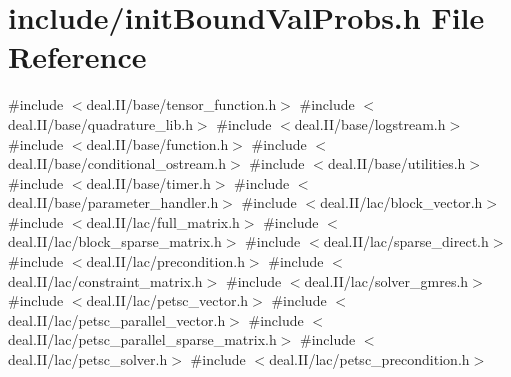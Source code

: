 \section{include/init\+Bound\+Val\+Probs.h File Reference}
\label{init_bound_val_probs_8h}
{\ttfamily \#include $<$deal.\+I\+I/base/tensor\+\_\+function.\+h$>$}\newline
{\ttfamily \#include $<$deal.\+I\+I/base/quadrature\+\_\+lib.\+h$>$}\newline
{\ttfamily \#include $<$deal.\+I\+I/base/logstream.\+h$>$}\newline
{\ttfamily \#include $<$deal.\+I\+I/base/function.\+h$>$}\newline
{\ttfamily \#include $<$deal.\+I\+I/base/conditional\+\_\+ostream.\+h$>$}\newline
{\ttfamily \#include $<$deal.\+I\+I/base/utilities.\+h$>$}\newline
{\ttfamily \#include $<$deal.\+I\+I/base/timer.\+h$>$}\newline
{\ttfamily \#include $<$deal.\+I\+I/base/parameter\+\_\+handler.\+h$>$}\newline
{\ttfamily \#include $<$deal.\+I\+I/lac/block\+\_\+vector.\+h$>$}\newline
{\ttfamily \#include $<$deal.\+I\+I/lac/full\+\_\+matrix.\+h$>$}\newline
{\ttfamily \#include $<$deal.\+I\+I/lac/block\+\_\+sparse\+\_\+matrix.\+h$>$}\newline
{\ttfamily \#include $<$deal.\+I\+I/lac/sparse\+\_\+direct.\+h$>$}\newline
{\ttfamily \#include $<$deal.\+I\+I/lac/precondition.\+h$>$}\newline
{\ttfamily \#include $<$deal.\+I\+I/lac/constraint\+\_\+matrix.\+h$>$}\newline
{\ttfamily \#include $<$deal.\+I\+I/lac/solver\+\_\+gmres.\+h$>$}\newline
{\ttfamily \#include $<$deal.\+I\+I/lac/petsc\+\_\+vector.\+h$>$}\newline
{\ttfamily \#include $<$deal.\+I\+I/lac/petsc\+\_\+parallel\+\_\+vector.\+h$>$}\newline
{\ttfamily \#include $<$deal.\+I\+I/lac/petsc\+\_\+parallel\+\_\+sparse\+\_\+matrix.\+h$>$}\newline
{\ttfamily \#include $<$deal.\+I\+I/lac/petsc\+\_\+solver.\+h$>$}\newline
{\ttfamily \#include $<$deal.\+I\+I/lac/petsc\+\_\+precondition.\+h$>$}\newline
